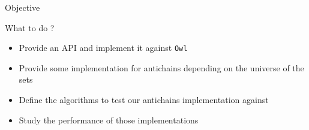 \documentclass[11pt]{beamer}
\begin{document}
\begin{frame}{Objective}{}
    \begin{block}{What to do ?}
        \begin{itemize}
            \item Provide an API and implement it against \texttt{Owl}
            \item Provide some implementation for antichains depending
            on the universe of the sets
            \item Define the algorithms to test our antichains
            implementation against
            \item Study the performance of those implementations
        \end{itemize}

    \end{block}
\end{frame}


{\aauwavesbg
\begin{frame}
\end{frame}}
\end{document}

